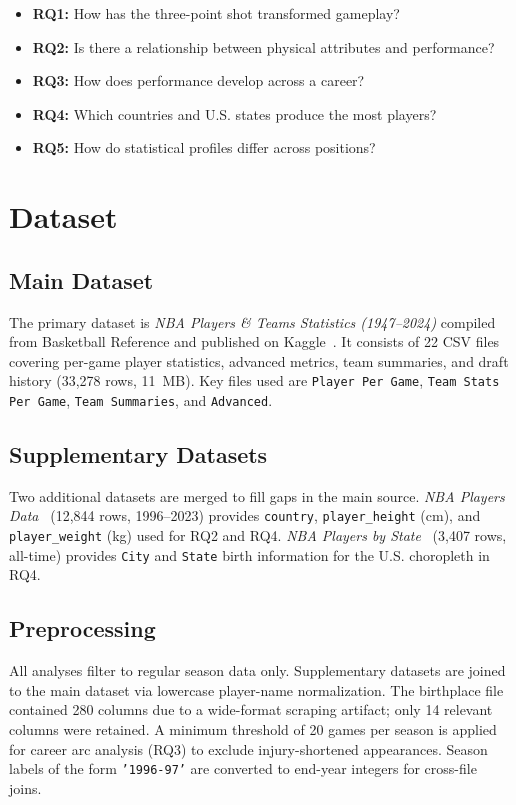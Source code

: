 \documentclass[conference]{IEEEtran}
\begin{document}
\begin{itemize}
  \item \textbf{RQ1:} How has the three-point shot transformed gameplay?
  \item \textbf{RQ2:} Is there a relationship between physical attributes and performance?
  \item \textbf{RQ3:} How does performance develop across a career?
  \item \textbf{RQ4:} Which countries and U.S. states produce the most players?
  \item \textbf{RQ5:} How do statistical profiles differ across positions?
\end{itemize}

\section{Dataset}

\subsection{Main Dataset}
The primary dataset is \textit{NBA Players \& Teams Statistics (1947--2024)} compiled from Basketball Reference and published on Kaggle~\cite{main_dataset}. It consists of 22 CSV files covering per-game player statistics, advanced metrics, team summaries, and draft history (33,278 rows, 11~MB). Key files used are \texttt{Player Per Game}, \texttt{Team Stats Per Game}, \texttt{Team Summaries}, and \texttt{Advanced}.

\subsection{Supplementary Datasets}
Two additional datasets are merged to fill gaps in the main source. \textit{NBA Players Data}~\cite{justinas_dataset} (12,844 rows, 1996--2023) provides \texttt{country}, \texttt{player\_height} (cm), and \texttt{player\_weight} (kg) used for RQ2 and RQ4. \textit{NBA Players by State}~\cite{birthplace_dataset} (3,407 rows, all-time) provides \texttt{City} and \texttt{State} birth information for the U.S. choropleth in RQ4.

\subsection{Preprocessing}
All analyses filter to regular season data only. Supplementary datasets are joined to the main dataset via lowercase player-name normalization. The birthplace file contained 280 columns due to a wide-format scraping artifact; only 14 relevant columns were retained. A minimum threshold of 20 games per season is applied for career arc analysis (RQ3) to exclude injury-shortened appearances. Season labels of the form \texttt{'1996-97'} are converted to end-year integers for cross-file joins.
\end{document}
